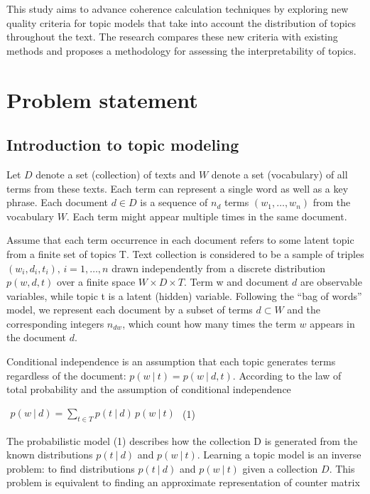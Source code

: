 \documentclass{article}
\begin{document}
This study aims to advance coherence calculation techniques by exploring new quality criteria for topic models that take into account the distribution of topics throughout the text. The research compares these new criteria with existing methods and proposes a methodology for assessing the interpretability of topics.

\section{Problem statement}

\subsection{Introduction to topic modeling}

Let $D$ denote a set (collection) of texts and $W$ denote a set (vocabulary) of all terms from these texts. Each term can represent a single word as well as a key phrase. Each document $d \in D$ is a sequence of $n_d$ terms $(w_1, \dots, w_n)$ from the vocabulary $W$. Each term might appear multiple times in the same document.

Assume that each term occurrence in each document refers to some latent topic from a finite set of topics T. Text collection is considered to be a sample of triples $(w_i,d_i,t_i),\, {i=1,\ldots ,n} $ drawn independently from a discrete distribution $p(w,d,t)$ over a finite space $W\times D \times T$. Term w and document $d$ are observable variables, while topic t is a latent (hidden) variable. Following the “bag of words” model, we represent each document by a subset of terms $d\subset W$ and the corresponding integers $n_{dw}$, which count how many times the term $w$ appears in the document $d$.

Conditional independence is an assumption that each topic generates terms regardless of the document: $p(w\ {\vert }\ t) = p(w\ {\vert }\ d,t)$. According to the law of total probability and the assumption of conditional independence

$\begin{aligned} p(w\ {\vert }\ d) = \sum _{t\in T} p(t\ {\vert }\ d)\, p(w\ {\vert }\ t)\end{aligned}$ (1)

The probabilistic model (1) describes how the collection D is generated from the known distributions $p(t\ {\vert }\ d)$ and $p(w\ {\vert }\ t)$. Learning a topic model is an inverse problem: to find distributions $p(t\ {\vert }\ d)$ and $p(w\ {\vert }\ t)$ given a collection $D$. This problem is equivalent to finding an approximate representation of counter matrix
\end{document}
